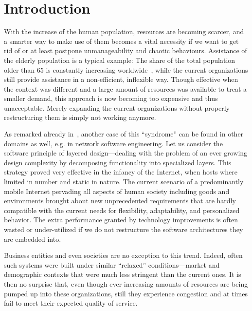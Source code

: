 \documentclass{llncs}
\begin{document}
\section{Introduction}


With the increase of the human population, resources are becoming scarcer, and a 
smarter way to make use of them becomes a vital necessity if we want to get rid 
of or at least postpone unmanageability and chaotic behaviours. Assistance of 
the elderly population is a typical example: The share of the total population 
older than 65 is constantly increasing worldwide~\cite{Euro04,Gou03}, while 
the current organizations still provide assistance in a non-efficient, 
inflexible way. Though effective when the context was different
and a large amount of resources was available to treat a smaller demand,
this approach is now becoming too expensive and thus unacceptable.
Merely expanding the current organizations without properly restructuring them is simply not working anymore.

As remarked already in~\cite{DeBl08a},
another case of this ``syndrome'' can be found in other domains as well,
e.g. in network software engineering. Let us consider
the software principle
of layered design---dealing with the problem of an ever growing
design complexity by decomposing functionality into specialized layers.
This strategy proved very effective in the infancy of the Internet,
when hosts where limited in number and static in nature. 
The current scenario of a predominantly mobile Internet pervading all aspects of
human society including goods and environments brought about
new unprecedented requirements that are hardly compatible with
the current needs for flexibility, adaptability, and personalized behavior.
The extra performance granted by technology improvements is often
wasted or under-utilized if we do not restructure the software
architectures they are embedded into.

Business entities and even societies are no exception to this
trend. Indeed, often such systems were built under similar
``relaxed'' conditions---market and demographic contexts that were much less
stringent than the current ones. It is then no surprise that,
even though ever increasing amounts of resources are being pumped up into
these organizations, still they experience congestion and at times
fail to meet their expected quality of service.
\end{document}
